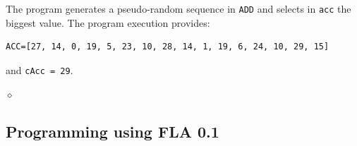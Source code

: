 \begin{exemplu}
The program generates a pseudo-random sequence in {\tt ADD} and selects in {\tt acc} the biggest value.
{\em 
{}
}
The program execution provides:
\begin{verbatim}
ACC=[27, 14, 0, 19, 5, 23, 10, 28, 14, 1, 19, 6, 24, 10, 29, 15]
\end{verbatim}
and {\tt cAcc = 29}.

$\diamond$
\end{exemplu}

\subsection{Programming using FLA 0.1}

